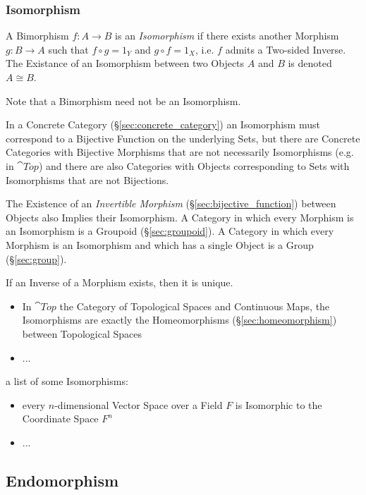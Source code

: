 \subsubsection{Isomorphism}\label{sec:isomorphism}

A Bimorphism $f : A \rightarrow B$ is an \emph{Isomorphism} if there exists
another Morphism $g : B \rightarrow A$ such that $f \circ g = 1_Y$ and $g \circ
f = 1_X$, i.e. $f$ admits a Two-sided Inverse. The Existance of an Isomorphism
between two Objects $A$ and $B$ is denoted $A \cong B$.

\fist Note that a Bimorphism need not be an Isomorphism.

In a Concrete Category (\S\ref{sec:concrete_category}) an Isomorphism must
correspond to a Bijective Function on the underlying Sets, but there are
Concrete Categories with Bijective Morphisms that are not necessarily
Isomorphisms (e.g. in $\cat{Top}$) and there are also Categories with Objects
corresponding to Sets with Isomorphisms that are not Bijections.

The Existence of an \emph{Invertible Morphism} (\S\ref{sec:bijective_function})
between Objects also Implies their Isomorphism. A Category in which every
Morphism is an Isomorphism is a Groupoid (\S\ref{sec:groupoid}). A Category in
which every Morphism is an Isomorphism and which has a single Object is a Group
(\S\ref{sec:group}).

If an Inverse of a Morphism exists, then it is unique.

\begin{itemize}
  \item In $\cat{Top}$ the Category of Topological Spaces and Continuous Maps,
    the Isomorphisms are exactly the Homeomorphisms
    (\S\ref{sec:homeomorphism}) between Topological Spaces
  \item ...
\end{itemize}

\asterism

a list of some Isomorphisms:
\begin{itemize}
  \item every $n$-dimensional Vector Space over a Field $F$ is Isomorphic to the
    Coordinate Space $F^n$
  \item ...
\end{itemize}



\subsection{Endomorphism}\label{sec:endomorphism}

